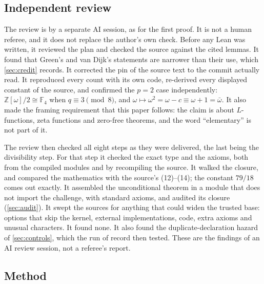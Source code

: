 \documentclass[11pt]{article}
\theoremstyle{definition}
\newcommand{\Z}{\mathbb{Z}}
\begin{document}
\subsection{Independent review}\label{sec:review}

The review is by a separate AI session, as for the first proof. It is not a human referee, and it does not replace the author's own check. Before any Lean was written, it reviewed the plan and checked the source against the cited lemmas. It found that Green's and van Dijk's statements are narrower than their use, which \cref{sec:credit} records. It corrected the pin of the source text to the commit actually read. It reproduced every count with its own code, re-derived every displayed constant of the source, and confirmed the $p = 2$ case independently: $\Z[\omega]/2 \cong \mathbb F_4$ when $q \equiv 3 \pmod 8$, and $\omega \mapsto \omega^2 = \omega - c \equiv \omega + 1 = \bar\omega$. It also made the framing requirement that this paper follows: the claim is about $L$-functions, zeta functions and zero-free theorems, and the word ``elementary'' is not part of it.

The review then checked all eight steps as they were delivered, the last being the divisibility step. For that step it checked the exact type and the axioms, both from the compiled modules and by recompiling the source. It walked the closure, and compared the mathematics with the source's (12)--(14); the constant $79/18$ comes out exactly. It assembled the unconditional theorem in a module that does not import the challenge, with standard axioms, and audited its closure (\cref{sec:audit}). It swept the sources for anything that could widen the trusted base: options that skip the kernel, external implementations,  code, extra axioms and unusual characters. It found none. It also found the duplicate-declaration hazard of \cref{sec:controls}, which the run of record then tested. These are the findings of an AI review session, not a referee's report.

\subsection{Method}
\end{document}
